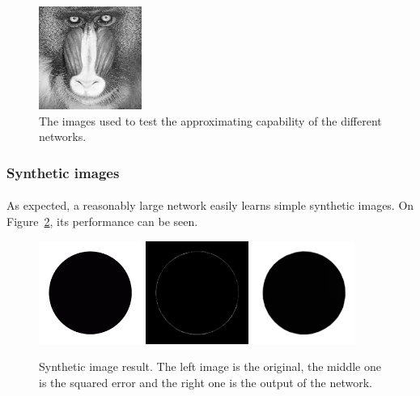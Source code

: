 \documentclass[a4paper]{article}
\begin{document}
\begin{figure}[h]
\includegraphics[width=0.3\textwidth]{images/baboon.jpeg}
\caption{\label{fig:imgs}The images used to test the approximating capability of the different networks.}
\end{figure}

\subsubsection{Synthetic images}

\paragraph{}As expected, a reasonably large network easily learns simple synthetic images. On Figure~\ref{fig:circ2}, its performance can be seen.

\begin{figure}[h]
\centering
\includegraphics[width=0.3\textwidth]{images/circ2.png}
\includegraphics[width=0.3\textwidth]{images_old/circ2e.png}
\includegraphics[width=0.3\textwidth]{images_old/circ2o.png}
\caption{\label{fig:circ2}Synthetic image result. The left image is the original, the middle one is the squared error and the right one is the output of the network.}
\end{figure}
\end{document}
